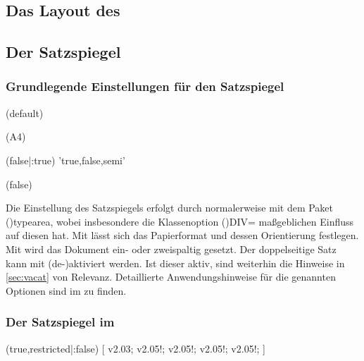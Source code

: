 \begin{DeclareEntity*}{}
\begin{DeclareEntity*}{}
\begin{DeclareEntity*}{}
\section{%
  Das Layout des \CDs%
}
\subsection{%
  Der Satzspiegel%
}
\subsubsection{Grundlegende Einstellungen für den Satzspiegel}

\begin{Entity}{}
\begin{Declaration}
  {}
  (default)
\begin{Declaration}
  {}
  (A4)
\begin{Declaration}
  {}
  (false|:true)
  'true,false,semi'
\begin{Declaration}
  {}
  (false)

Die Einstellung des Satzspiegels erfolgt durch \KOMAScript normalerweise mit 
dem Paket \Package(){typearea}, wobei insbesondere die 
Klassenoption \Option(){DIV=\PMisc} maßgeblichen Einfluss auf 
diesen hat. Mit 
 lässt sich das Papierformat und dessen Orientierung 
festlegen. Mit  wird das Dokument ein- oder 
zweispaltig gesetzt. Der doppelseitige Satz kann mit  
(de-)aktiviert werden. Ist dieser aktiv, sind weiterhin die Hinweise in 
\autoref{sec:vacat} von Relevanz. Detaillierte Anwendungshinweise für die 
genannten Optionen sind im \scrguide zu finden.
\end{Declaration}
\end{Declaration}
\end{Declaration}
\end{Declaration}
\end{Entity}



\subsubsection{Der Satzspiegel im \TUDCD}

\begin{Declaration}
  {}
  (true,restricted|:false)
[%
  v2.03;
  v2.05!;%
  v2.05!;%
  v2.05!;%
  v2.05!;%
]
\printdeclarationlist


\end{Declaration}
\end{DeclareEntity*}
\end{DeclareEntity*}
\end{DeclareEntity*}

